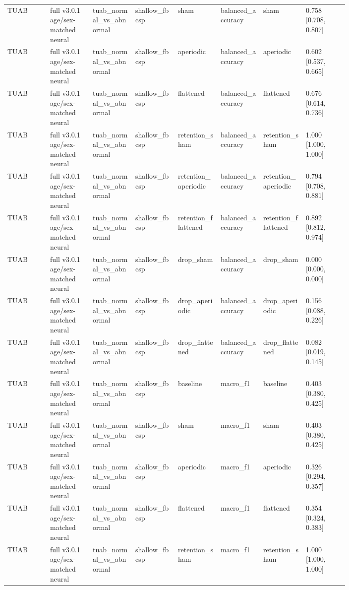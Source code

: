 \begin{longtable}{p{0.10\linewidth}p{0.10\linewidth}p{0.10\linewidth}p{0.10\linewidth}p{0.10\linewidth}p{0.10\linewidth}p{0.10\linewidth}p{0.10\linewidth}}
TUAB & full v3.0.1 age/sex-matched neural & tuab\_normal\_vs\_abnormal & shallow\_fbcsp & sham & balanced\_accuracy & sham & 0.758 [0.708, 0.807]\\
TUAB & full v3.0.1 age/sex-matched neural & tuab\_normal\_vs\_abnormal & shallow\_fbcsp & aperiodic & balanced\_accuracy & aperiodic & 0.602 [0.537, 0.665]\\
TUAB & full v3.0.1 age/sex-matched neural & tuab\_normal\_vs\_abnormal & shallow\_fbcsp & flattened & balanced\_accuracy & flattened & 0.676 [0.614, 0.736]\\
TUAB & full v3.0.1 age/sex-matched neural & tuab\_normal\_vs\_abnormal & shallow\_fbcsp & retention\_sham & balanced\_accuracy & retention\_sham & 1.000 [1.000, 1.000]\\
TUAB & full v3.0.1 age/sex-matched neural & tuab\_normal\_vs\_abnormal & shallow\_fbcsp & retention\_aperiodic & balanced\_accuracy & retention\_aperiodic & 0.794 [0.708, 0.881]\\
TUAB & full v3.0.1 age/sex-matched neural & tuab\_normal\_vs\_abnormal & shallow\_fbcsp & retention\_flattened & balanced\_accuracy & retention\_flattened & 0.892 [0.812, 0.974]\\
TUAB & full v3.0.1 age/sex-matched neural & tuab\_normal\_vs\_abnormal & shallow\_fbcsp & drop\_sham & balanced\_accuracy & drop\_sham & 0.000 [0.000, 0.000]\\
TUAB & full v3.0.1 age/sex-matched neural & tuab\_normal\_vs\_abnormal & shallow\_fbcsp & drop\_aperiodic & balanced\_accuracy & drop\_aperiodic & 0.156 [0.088, 0.226]\\
TUAB & full v3.0.1 age/sex-matched neural & tuab\_normal\_vs\_abnormal & shallow\_fbcsp & drop\_flattened & balanced\_accuracy & drop\_flattened & 0.082 [0.019, 0.145]\\
TUAB & full v3.0.1 age/sex-matched neural & tuab\_normal\_vs\_abnormal & shallow\_fbcsp & baseline & macro\_f1 & baseline & 0.403 [0.380, 0.425]\\
TUAB & full v3.0.1 age/sex-matched neural & tuab\_normal\_vs\_abnormal & shallow\_fbcsp & sham & macro\_f1 & sham & 0.403 [0.380, 0.425]\\
TUAB & full v3.0.1 age/sex-matched neural & tuab\_normal\_vs\_abnormal & shallow\_fbcsp & aperiodic & macro\_f1 & aperiodic & 0.326 [0.294, 0.357]\\
TUAB & full v3.0.1 age/sex-matched neural & tuab\_normal\_vs\_abnormal & shallow\_fbcsp & flattened & macro\_f1 & flattened & 0.354 [0.324, 0.383]\\
TUAB & full v3.0.1 age/sex-matched neural & tuab\_normal\_vs\_abnormal & shallow\_fbcsp & retention\_sham & macro\_f1 & retention\_sham & 1.000 [1.000, 1.000]\\

\end{longtable}
